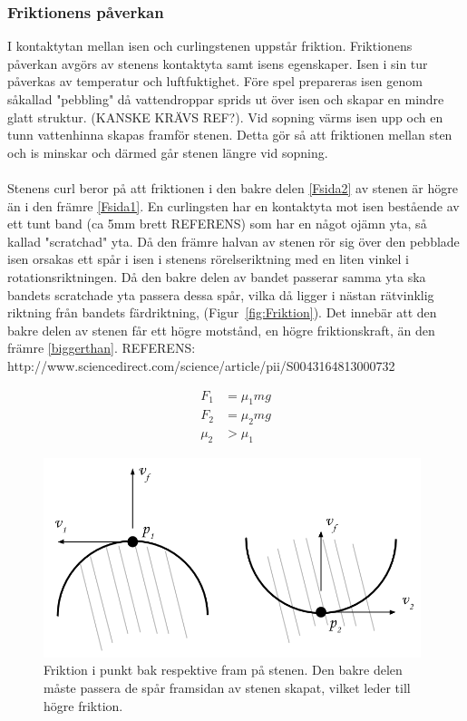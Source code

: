 \documentclass[11pt]{article} %
\begin{document}
\subsubsection{Friktionens påverkan}
I kontaktytan mellan isen och curlingstenen uppstår friktion. Friktionens påverkan avgörs av stenens kontaktyta samt isens egenskaper. Isen i sin tur påverkas av temperatur och luftfuktighet. Före spel prepareras isen genom såkallad "pebbling" då vattendroppar sprids ut över isen och skapar en mindre glatt struktur. (KANSKE KRÄVS REF?). 
Vid sopning värms isen upp och en tunn vattenhinna skapas framför stenen. Detta gör så att friktionen mellan sten och is minskar och därmed går stenen längre vid sopning.  
\\\\Stenens curl beror på att friktionen i den bakre delen \eqref{Fsida2} av stenen är högre än i den främre \eqref{Fsida1}.  
En curlingsten har en kontaktyta mot isen bestående av ett tunt band (ca 5mm brett REFERENS) som har en något ojämn yta, så kallad "scratchad" yta. Då den främre halvan av stenen rör sig över den pebblade isen orsakas ett spår i isen i stenens rörelseriktning med en liten vinkel i rotationsriktningen. Då den bakre delen av bandet passerar samma yta ska bandets scratchade yta passera dessa spår, vilka då ligger i nästan rätvinklig riktning från bandets färdriktning, (Figur~\ref{fig:Friktion}). Det innebär att den bakre delen av stenen får ett högre motstånd, en högre friktionskraft, än den främre \eqref{biggerthan}. 
REFERENS: http://www.sciencedirect.com/science/article/pii/S0043164813000732

 \begin{align}\label{Fsida1}
 F_1& = \mu_1 mg\\\label{Fsida2}
F_2& = \mu_2 mg\\\label{biggerthan}
\mu_2& > \mu_1
 \end{align}

\begin{figure}[ht!]
\centering
\includegraphics[width=110mm]{Friktion_bakfram.png}
\caption{Friktion i punkt bak respektive fram på stenen. Den bakre delen måste passera de spår framsidan av stenen skapat, vilket leder till högre friktion.}
\label{fig:Friktion}
\label{overflow}
\end{figure}
\end{document}
